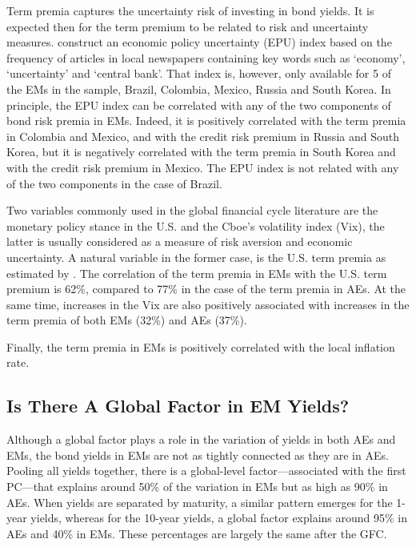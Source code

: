 {Term premia captures the uncertainty risk of investing in bond yields.
It is expected then for the term premium to be related to risk and uncertainty measures.
\citet*{BakerBloomDavis:2016} construct an economic policy uncertainty (EPU) index based on the frequency of articles in local newspapers containing key words such as `economy', `uncertainty' and `central bank'. That index is, however, only available for 5 of the EMs in the sample, Brazil, Colombia, Mexico, Russia and South Korea.
In principle, the EPU index can be correlated with any of the two components of bond risk premia in EMs.
Indeed, it is positively correlated with the term premia in Colombia and Mexico, and with the credit risk premium in Russia and South Korea, but it is negatively correlated with the term premia in South Korea and with the credit risk premium in Mexico.
The EPU index is not related with any of the two components in the case of Brazil.

Two variables commonly used in the global financial cycle literature \citep[see][]{Rey:2013} are the monetary policy stance in the U.S. and the Cboe's volatility index (Vix), the latter is usually considered as a measure of risk aversion and economic uncertainty.
A natural variable in the former case, is the U.S. term premia as estimated by \cite{KimWright:2005}.
The correlation of the term premia in EMs with the U.S. term premium is 62\%, compared to 77\% in the case of the term premia in AEs.
At the same time, increases in the Vix are also positively associated with increases in the term premia of both EMs (32\%) and AEs (37\%).

Finally, the term premia in EMs is positively correlated with the local inflation rate.


\subsection{Is There A Global Factor in EM Yields?} \label{sec:globalPC}
\iftoggle{toclinks}{\gototoc}{} %

Although a global factor plays a role in the variation of yields in both AEs and EMs, the bond yields in EMs are not as tightly connected as they are in AEs.
Pooling all yields together, there is a global-level factor---associated with the first PC---that explains around 50\% of the variation in EMs but as high as 90\% in AEs. 
When yields are separated by maturity, a similar pattern emerges for the 1-year yields, whereas for the 10-year yields, a global factor explains around 95\% in AEs and 40\% in EMs. 
These percentages are largely the same after the GFC.

}
